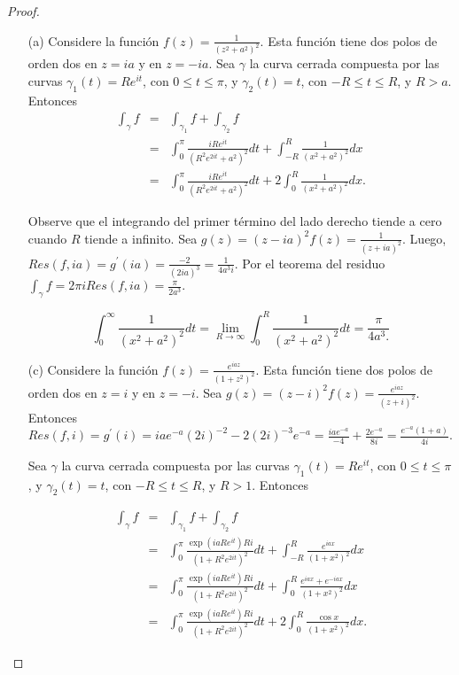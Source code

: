 \documentclass[12pt]{article}
\begin{document}
\begin{proof} \text{ }
\begin{itemize}
\item[(a)] Considere la función $f(z) = \frac{1}{(z^2 + a^2)^2}$. Esta función tiene dos polos de orden dos en $z = ia$ y en $z = -ia$. Sea $\gamma$ la curva cerrada compuesta por las curvas $\gamma_1(t) = R e^{it}$, con $0 \leq t \leq \pi$, y $\gamma_2(t) = t$, con $- R \leq t \leq R$,  y $R > a.$ Entonces
\begin{eqnarray*}
\int_\gamma f &=& \int_{\gamma_1} f + \int_{\gamma_2} f \\
&=& \int_0^\pi \frac{iR e^{it}}{(R^2 e^{2it} + a^2 )^2}dt + \int_{-R}^R \frac{1}{(x^2 + a^2)^2}dx \\
&=&  \int_0^\pi \frac{iR e^{it}}{(R^2 e^{2it} + a^2 )^2} dt + 2 \int_{0}^R \frac{1}{(x^2 + a^2)^2} dx.
\end{eqnarray*}

Observe que el integrando del primer término del lado derecho tiende a cero cuando $R$ tiende a infinito. Sea $g(z) = (z - ia)^2 f(z) = \frac{1}{(z+ia)^2}$. Luego, $Res(f, ia) = g^\prime(ia) =  \frac{-2}{(2ia)^3} = \frac{1}{ 4a^3 i}$. 
Por el teorema del residuo $\int_\gamma f = 2 \pi i Res(f, ia) = \frac{\pi}{2a^3}.$ 

$$\int_0^\infty \frac{1}{(x^2 + a^2)^2} dt= \lim_{R \to \infty} \int_0^R \frac{1}{(x^2 + a^2)^2} dt = \frac{\pi}{4 a^3.} $$

\item[(c)] Considere la función $f(z) = \frac{e^{iaz}}{(1 + z^2)^2}$. Esta función tiene dos polos de orden dos en $z = i$ y en $z = -i$. Sea $g(z) = (z-i)^2 f(z) = \frac{e^{iaz}}{(z+i)^2}$. Entonces $Res(f, i) = g^\prime(i) = ia e^{-a}(2i)^{-2} -2(2i)^{-3} e^{-a} = \frac{iae^{-a}}{-4} + \frac{2e^{-a}}{8i}  = \frac{e^{-a}(1+a)}{4i}.$

Sea $\gamma$ la curva cerrada compuesta por las curvas $\gamma_1(t) = R e^{it}$, con $0 \leq t \leq \pi$, y $\gamma_2(t) = t$, con $- R \leq t \leq R$,  y $R > 1.$ Entonces

\begin{eqnarray*}
\int_\gamma f &=& \int_{\gamma_1} f + \int_{\gamma_2} f \\
&=& \int_0^\pi \frac{\exp{(ia R e^{it})} Ri }{(1 + R^2 e^{2it})^2} dt + \int_{-R}^R \frac{e^{iax}}{(1+x^2)^2} dx \\
&=& \int_0^\pi \frac{\exp{(ia R e^{it})} Ri }{(1 + R^2 e^{2it})^2} dt + \int_0^R \frac{e^{iax} + e^{-iax}}{(1+x^2)^2} dx \\
&=&  \int_0^\pi \frac{\exp{(ia R e^{it})} Ri }{(1 + R^2 e^{2it})^2} dt + 2 \int_0^R \frac{\cos x}{(1 +x^2)^2}dx. 
\end{eqnarray*}


\end{itemize}
\end{proof}
\end{document}
